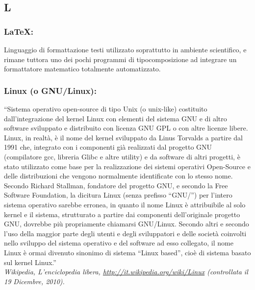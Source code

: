 \subsection*{\huge{L}}
\subsubsection*{LaTeX:} Linguaggio di formattazione testi utilizzato
soprattutto in ambiente scientifico, e rimane tuttora uno dei pochi programmi
di tipocomposizione ad integrare un formattatore matematico totalmente automatizzato.

\subsubsection{Linux (o GNU/Linux):} ``Sistema operativo open-source di
tipo Unix (o unix-like) costituito dall'integrazione del kernel Linux con
elementi del sistema GNU e di altro software sviluppato e distribuito con
licenza GNU GPL o con altre licenze libere. Linux, in realt\`a, \`e il nome del
kernel sviluppato da Linus Torvalds a partire dal 1991 che, integrato con i
componenti gi\`a realizzati dal progetto GNU (compilatore gcc, libreria Glibc e
altre utility) e da software di altri progetti, \`e stato utilizzato come base per
la realizzazione dei sistemi operativi Open-Source e delle distribuzioni che
vengono normalmente identificate con lo stesso nome. Secondo Richard Stallman,
fondatore del progetto GNU, e secondo la Free Software Foundation, la dicitura
Linux (senza prefisso ``GNU/'') per l'intero sistema operativo sarebbe erronea, in
quanto il nome Linux \`e attribuibile al solo kernel e il sistema, strutturato a
partire dai componenti dell'originale progetto GNU, dovrebbe pi\`u propriamente
chiamarsi GNU/Linux. Secondo altri e secondo l'uso della maggior parte degli
utenti e degli sviluppatori e delle societ\`a coinvolti nello sviluppo del sistema
operativo e del software ad esso collegato, il nome Linux \`e ormai divenuto
sinonimo di sistema ``Linux based'', cio\`e di sistema basato sul kernel
Linux.''\\ \emph{Wikipedia, L'enciclopedia libera,
\url{http://it.wikipedia.org/wiki/Linux} (controllata il 19 Dicembre, 2010).}


